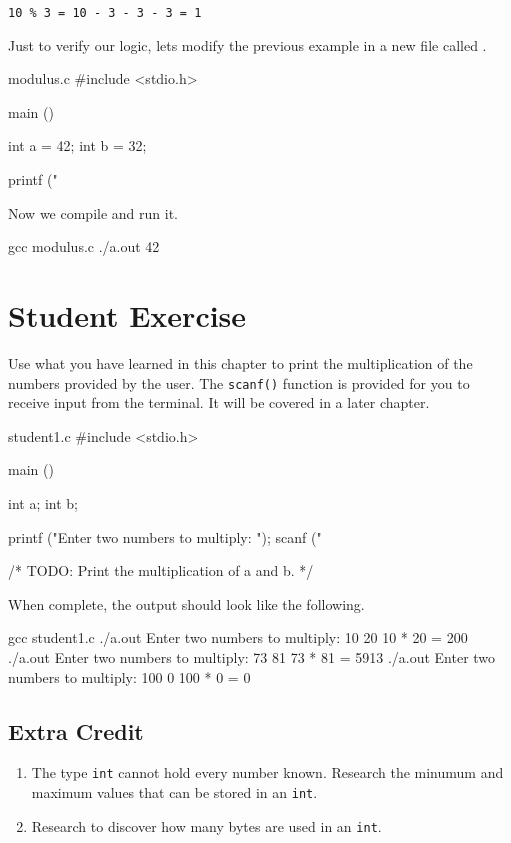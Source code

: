 \begin{center}
\verb|10 % 3 = 10 - 3 - 3 - 3 = 1|
\end{center}

Just to verify our logic, lets modify the previous example in a new file
called .

\begin{code}{modulus.c}
#include <stdio.h>

main ()
{
    int a = 42;
    int b = 32;

    printf ("%
}
\end{code}

Now we compile  and run it.

\begin{Terminal}
gcc modulus.c
./a.out
42 %
\end{Terminal}

\section{Student Exercise}

Use what you have learned in this chapter to print the multiplication of
the numbers provided by the user. The \verb|scanf()| function is provided for
you to receive input from the terminal. It will be covered in a later chapter.

\begin{code}{student1.c}
#include <stdio.h>

main ()
{
    int a;
    int b;

    printf ("Enter two numbers to multiply:  ");
    scanf ("%

    /* TODO: Print the multiplication of a and b. */
}
\end{code}

When complete, the output should look like the following.

\begin{Terminal}
gcc student1.c
./a.out
Enter two numbers to multiply:  10 20
10 * 20 = 200
./a.out
Enter two numbers to multiply:  73 81
73 * 81 = 5913
./a.out
Enter two numbers to multiply:  100 0
100 * 0 = 0
\end{Terminal}


\subsection{Extra Credit}

\begin{enumerate}
\item The type \verb|int| cannot hold every number known. Research the minumum
and maximum values that can be stored in an \verb|int|.
\item Research to discover how many bytes are used in an \verb|int|.
\end{enumerate}
